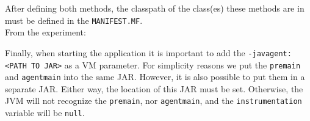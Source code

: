 After defining both methods, the classpath of the class(es) these methods are in must be defined in the \lstinline{MANIFEST.MF}.\\
From the experiment:


Finally, when starting the application it is important to add the \lstinline{-javagent:<PATH TO JAR>} as a VM parameter.
For simplicity reasons we put the \lstinline{premain} and \lstinline{agentmain} into the same JAR.
However, it is also possible to put them in a separate JAR.
Either way, the location of this JAR must be set.
Otherwise, the JVM will not recognize the \lstinline{premain}, nor \lstinline{agentmain}, and the \lstinline{instrumentation} variable will be \texttt{null}.